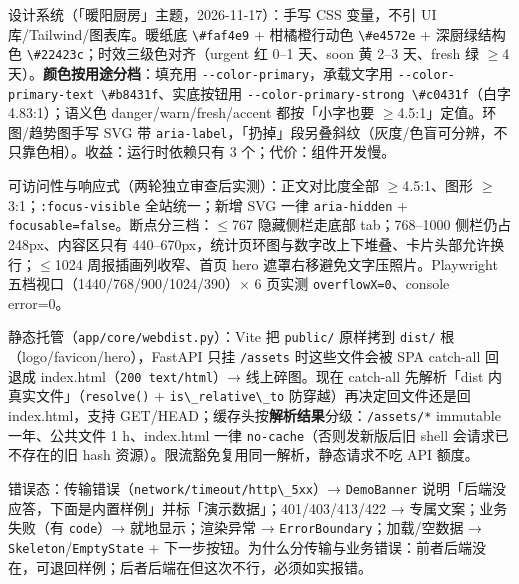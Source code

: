 设计系统（「暖阳厨房」主题，2026-11-17）：手写 CSS 变量，不引 UI
库/Tailwind/图表库。暖纸底 \passthrough{\lstinline!\#faf4e9!} +
柑橘橙行动色 \passthrough{\lstinline!\#e4572e!} + 深厨绿结构色
\passthrough{\lstinline!\#22423c!}；时效三级色对齐（urgent 红 0--1
天、soon 黄 2--3 天、fresh 绿 \ensuremath{\ge}4 天）。\textbf{颜色按用途分档}：填充用
\passthrough{\lstinline!--color-primary!}，承载文字用
\passthrough{\lstinline!--color-primary-text \#b8431f!}、实底按钮用
\passthrough{\lstinline!--color-primary-strong \#c0431f!}（白字
4.83:1）；语义色 danger/warn/fresh/accent 都按「小字也要
\ensuremath{\ge}4.5:1」定值。环图/趋势图手写 SVG 带
\passthrough{\lstinline!aria-label!}，「扔掉」段另叠斜纹（灰度/色盲可分辨，不只靠色相）。收益：运行时依赖只有
3 个；代价：组件开发慢。

可访问性与响应式（两轮独立审查后实测）：正文对比度全部 \ensuremath{\ge}4.5:1、图形
\ensuremath{\ge}3:1；\passthrough{\lstinline!:focus-visible!} 全站统一；新增 SVG 一律
\passthrough{\lstinline!aria-hidden!} +
\passthrough{\lstinline!focusable=false!}。断点分三档：\ensuremath{\le}767
隐藏侧栏走底部 tab；768--1000 侧栏仍占 248px、内容区只有
440--670px，统计页环图与数字改上下堆叠、卡片头部允许换行；\ensuremath{\le}1024
周报插画列收窄、首页 hero 遮罩右移避免文字压照片。Playwright
五档视口（1440/768/900/1024/390）× 6 页实测
\passthrough{\lstinline!overflowX=0!}、console error=0。

静态托管（\passthrough{\lstinline!app/core/webdist.py!}）：Vite 把
\passthrough{\lstinline!public/!} 原样拷到
\passthrough{\lstinline!dist/!} 根（logo/favicon/hero），FastAPI 只挂
\passthrough{\lstinline!/assets!} 时这些文件会被 SPA catch-all 回退成
index.html（\passthrough{\lstinline!200 text/html!}）→ 线上碎图。现在
catch-all 先解析「dist 内真实文件」（\passthrough{\lstinline!resolve()!}
+ \passthrough{\lstinline!is\_relative\_to!} 防穿越）再决定回文件还是回
index.html，支持
GET/HEAD；缓存头按\textbf{解析结果}分级：\passthrough{\lstinline!/assets/*!}
immutable 一年、公共文件 1 h、index.html 一律
\passthrough{\lstinline!no-cache!}（否则发新版后旧 shell
会请求已不存在的旧 hash 资源）。限流豁免复用同一解析，静态请求不吃 API
额度。

错误态：传输错误（\passthrough{\lstinline!network/timeout/http\_5xx!}）→
\passthrough{\lstinline!DemoBanner!}
说明「后端没应答，下面是内置样例」并标「演示数据」；401/403/413/422 →
专属文案；业务失败（有 \passthrough{\lstinline!code!}）→
就地显示；渲染异常 →
\passthrough{\lstinline!ErrorBoundary!}；加载/空数据 →
\passthrough{\lstinline!Skeleton!}/\passthrough{\lstinline!EmptyState!}
+
下一步按钮。为什么分传输与业务错误：前者后端没在，可退回样例；后者后端在但这次不行，必须如实报错。

